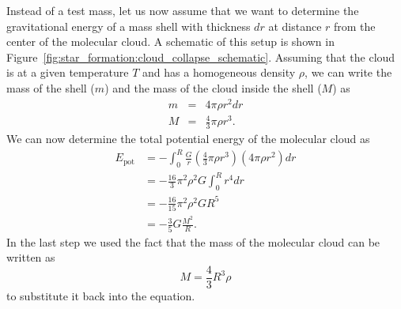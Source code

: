 Instead of a test mass, let us now assume that we want to determine the gravitational energy of a mass shell with thickness $dr$ at distance $r$ from the center of the molecular cloud. A schematic of this setup is shown in Figure~\ref{fig:star_formation:cloud_collapse_schematic}. Assuming that the cloud is at a given temperature $T$ and has a homogeneous density $\rho$, we can write the mass of the shell ($m$) and the mass of the cloud inside the shell ($M$) as
\begin{eqnarray}
    m &=& 4 \pi \rho r^2 dr \label{eqn:star_formation:mass_molecular_cloud_shell} \\
    M &=& \frac{4}{3} \pi \rho r^3 \label{eqn:star_formation:mass_molecular_cloud}.
\end{eqnarray}
We can now determine the total potential energy of the molecular cloud as
\begin{equation}
    \begin{aligned}
        E_\mathrm{pot} &= -\int_0^R \frac{G}{r}\left( \frac{4}{3} \pi \rho r^3\right) \left( 4\pi \rho r^2\right) dr \\
        &=  -\frac{16}{3} \pi^2 \rho^{2} G \int_0^R r^4 dr \\
        &= -\frac{16}{15} \pi^2 \rho^2 GR^5 \\
        &= -\frac{3}{5}G\frac{M^2}{R}.
    \end{aligned}
    \label{eqn:star_formation:epot}
\end{equation}
In the last step we used the fact that the mass of the molecular cloud can be written as
\begin{equation}
    M = \frac{4}{3} R^3 \rho
\end{equation}
to substitute it back into the equation.

